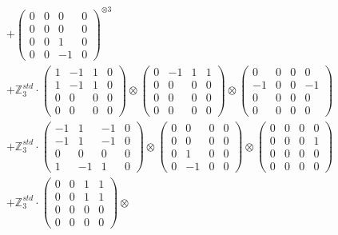 \documentclass{article}
\begin{document}
{\begin{align}
        &+ \label{Rs16-Rc11-Solution-31-c16} \begin{pmatrix} 0 & 0 & 0 & 0 \\ 0 & 0 & 0 & 0 \\ 0 & 0 & 1 & 0 \\ 0 & 0 & -1 & 0 \end{pmatrix}^{\otimes 3} \\
        &+ \label{Rs16-Rc11-Solution-31-c17} \mathbb{Z}_3^{std} \cdot 
            \begin{pmatrix} 1 & -1 & 1 & 0 \\ 1 & -1 & 1 & 0 \\ 0 & 0 & 0 & 0 \\ 0 & 0 & 0 & 0 \end{pmatrix} \otimes 
            \begin{pmatrix} 0 & -1 & 1 & 1 \\ 0 & 0 & 0 & 0 \\ 0 & 0 & 0 & 0 \\ 0 & 0 & 0 & 0 \end{pmatrix} \otimes 
            \begin{pmatrix} 0 & 0 & 0 & 0 \\ -1 & 0 & 0 & -1 \\ 0 & 0 & 0 & 0 \\ 0 & 0 & 0 & 0 \end{pmatrix} \\ 
        &+ \label{Rs16-Rc11-Solution-31-c18} \mathbb{Z}_3^{std} \cdot 
            \begin{pmatrix} -1 & 1 & -1 & 0 \\ -1 & 1 & -1 & 0 \\ 0 & 0 & 0 & 0 \\ 1 & -1 & 1 & 0 \end{pmatrix} \otimes 
            \begin{pmatrix} 0 & 0 & 0 & 0 \\ 0 & 0 & 0 & 0 \\ 0 & 1 & 0 & 0 \\ 0 & -1 & 0 & 0 \end{pmatrix} \otimes 
            \begin{pmatrix} 0 & 0 & 0 & 0 \\ 0 & 0 & 0 & 1 \\ 0 & 0 & 0 & 0 \\ 0 & 0 & 0 & 0 \end{pmatrix} \\ 
        &+ \label{Rs16-Rc11-Solution-31-c19} \mathbb{Z}_3^{std} \cdot 
            \begin{pmatrix} 0 & 0 & 1 & 1 \\ 0 & 0 & 1 & 1 \\ 0 & 0 & 0 & 0 \\ 0 & 0 & 0 & 0 \end{pmatrix} \otimes 

\end{align}}
\end{document}
